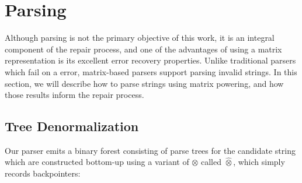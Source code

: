 \documentclass[sigplan,review,anonymous,acmsmall]{acmart}\settopmatter{printfolios=false,printccs=false,printacmref=false}
\begin{document}
%
%



\section{Parsing}\label{sec:parsing}

Although parsing is not the primary objective of this work, it is an integral component of the repair process, and one of the advantages of using a matrix representation is its excellent error recovery properties. Unlike traditional parsers which fail on a error, matrix-based parsers support parsing invalid strings. In this section, we will describe how to parse strings using matrix powering, and how those results inform the repair process.

\subsection{Tree Denormalization}\label{sec:denormalization}


Our parser emits a binary forest consisting of parse trees for the candidate string which are constructed bottom-up using a variant of $\otimes$ called $\hat{\otimes}$, which simply records backpointers:
\end{document}
